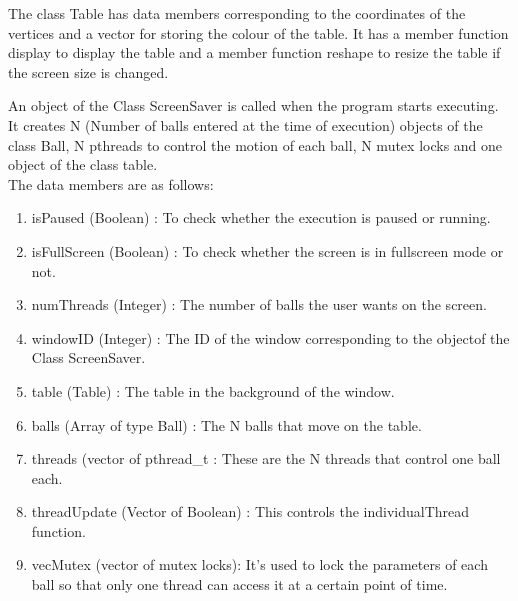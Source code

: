 \documentclass[]{article}
\begin{document}
\begin{flushleft}
The class Table has data members corresponding to the coordinates of the vertices and a vector for storing the colour of the table. It has a member function display to display the table and a member function reshape to resize the table if the screen size is changed.  
\end{flushleft}

\begin{flushleft}
An object of the Class ScreenSaver is called when the program starts executing. It creates N (Number of balls entered at the time of execution) objects of the class Ball, N pthreads to control the motion of each ball, N mutex locks and one object of the class table. \\
The data members are as follows: \\
\begin{enumerate}
\item isPaused (Boolean) : To check whether the execution is paused or running.
\item isFullScreen (Boolean) : To check whether the screen is in fullscreen mode or not.
\item numThreads (Integer) : The number of balls the user wants on the screen.
\item windowID (Integer) : The ID of the window corresponding to the objectof the Class ScreenSaver.
\item table (Table) : The table in the background of the window.
\item balls (Array of type Ball) : The N balls that move on the table.
\item threads (vector of pthread\_t : These are the N threads that control one ball each.
\item threadUpdate (Vector of Boolean) : This controls the individualThread function.
\item vecMutex (vector of mutex locks): It's used to lock the parameters of each ball so that only one thread can access it at a certain point of time. 
\end{enumerate}


\end{flushleft}
\end{document}
